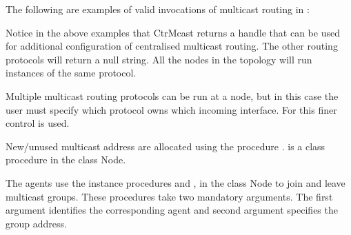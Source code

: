 
The following are examples of valid
invocations of multicast routing in \ns:
Notice in the above examples that CtrMcast returns a handle that can
be used for additional configuration of centralised multicast routing.
The other routing protocols will return a null string.  All the
nodes in the topology will run instances of the same protocol.

Multiple multicast routing protocols can be run at a node, but in this
case the user must specify which protocol owns which incoming
interface.  For this finer control  is used.

New/unused multicast address are allocated using the procedure
.
is a class procedure in the class Node.

The agents use the instance procedures
 and , in
the class Node to join and leave multicast groups. These procedures
take two mandatory arguments. The first argument identifies the
corresponding agent and second argument specifies the group address.

